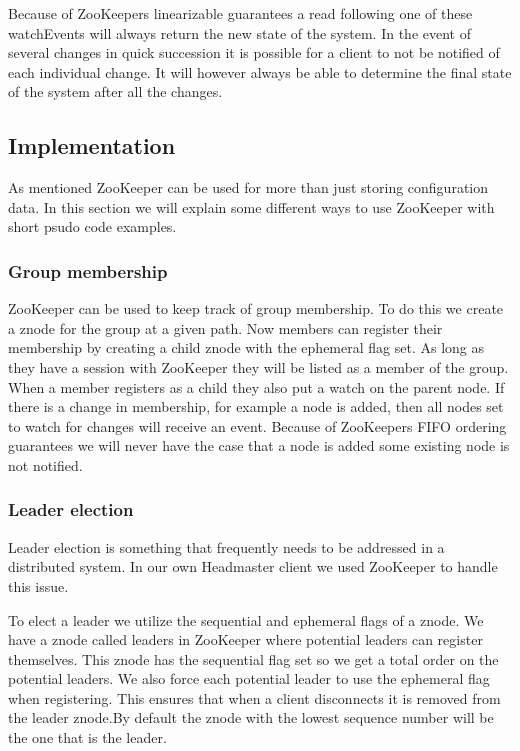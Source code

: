 Because of ZooKeepers linearizable guarantees a read following one of these watchEvents will always return the new state of the system. In the event of several changes in quick succession it is possible for a client to not be notified of each individual change. It will however always be able to determine the final state of the system after all the changes.

\subsection{Implementation}

As mentioned ZooKeeper can be used for more than just storing configuration data. In this section we will explain some different ways to use ZooKeeper with short psudo code examples. 

\subsubsection{Group membership}
ZooKeeper can be used to keep track of group membership. To do this we create a znode for the group at a given path. Now members can register their membership by creating a child znode with the ephemeral flag set. As long as they have a session with ZooKeeper they will be listed as a member of the group. When a member registers as a child they also put a watch on the parent node. If there is a change in membership, for example a node is added, then all nodes set to watch for changes will receive an event. Because of ZooKeepers FIFO ordering guarantees we will never have the case that a node is added some existing node is not notified. 

\subsubsection{Leader election}
Leader election is something that frequently needs to be addressed in a distributed system. In our own Headmaster client we used ZooKeeper to handle this issue. 

To elect a leader we utilize the sequential and ephemeral flags of a znode. We have a znode called leaders in ZooKeeper where potential leaders can register themselves. This znode has the sequential flag set so we get a total order on the potential leaders. We also force each potential leader to use the ephemeral flag when registering. This ensures that when a client disconnects it is removed from the leader znode.By default the znode with the lowest sequence number will be the one that is the leader.


